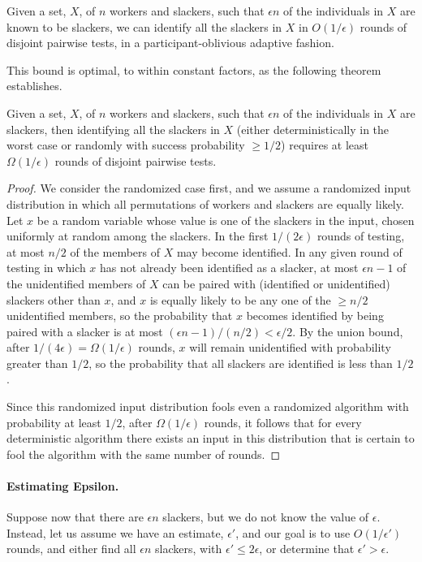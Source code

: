 \documentclass[11pt]{llncs}
\renewcommand{\subsection}[1]{\paragraph{\bf #1.}}
\begin{document}
\begin{theorem}
Given a set, $X$, of $n$ workers and slackers, such that $\epsilon n$ of the
individuals in $X$ are known to be slackers, 
we can identify all the slackers in $X$
in $O(1/\epsilon)$ rounds of disjoint pairwise tests, in a participant-oblivious adaptive fashion. 
\end{theorem}

This bound is optimal, to within constant factors, as the following
theorem establishes.

\begin{theorem}
Given a set, $X$, of $n$ workers and slackers, such that $\epsilon n$ of the
individuals in $X$ are slackers, then identifying all the slackers in $X$ (either deterministically in the worst case or randomly with success probability $\ge 1/2$)
requires at least
$\Omega(1/\epsilon)$ rounds of disjoint pairwise tests.
\end{theorem}

\begin{proof}
We consider the randomized case first, and we assume a randomized input distribution in which all permutations of workers and slackers are equally likely. Let $x$ be a random variable whose value is one of the slackers in the input, chosen uniformly at random among the slackers. In the first $1/(2\epsilon)$ rounds of testing, at most $n/2$ of the members of $X$ may become identified.
 In any given round of testing in which $x$ has not already been identified as a slacker, at most $\epsilon n -1$ of the unidentified members of $X$ can be paired with (identified or unidentified) slackers other than $x$, and $x$ is equally likely to be any one of the $\ge n/2$ unidentified members,  so the probability that $x$ becomes identified by being paired with a slacker is at most $(\epsilon n-1)/(n/2)<\epsilon/2$. By the union bound, after $1/(4\epsilon)=\Omega(1/\epsilon)$ rounds, $x$ will remain unidentified with probability greater than $1/2$, so the probability that all slackers are identified is less than $1/2$.

Since this randomized input distribution fools even a randomized algorithm with probability at least $1/2$, after $\Omega(1/\epsilon)$ rounds, it follows that for every deterministic algorithm there exists an input in this distribution that is certain to fool the algorithm with the same number of rounds. 
\end{proof}

\subsection{Estimating Epsilon}
Suppose now that there are
$\epsilon n$ slackers, but we do not know the value of $\epsilon$.
Instead, let us assume we
have an estimate, $\epsilon'$, and our goal is to 
use $O(1/\epsilon')$ rounds,
and either find all $\epsilon n$ slackers, with
$\epsilon'\le 2\epsilon$,
or determine that $\epsilon'>\epsilon$.
\end{document}

